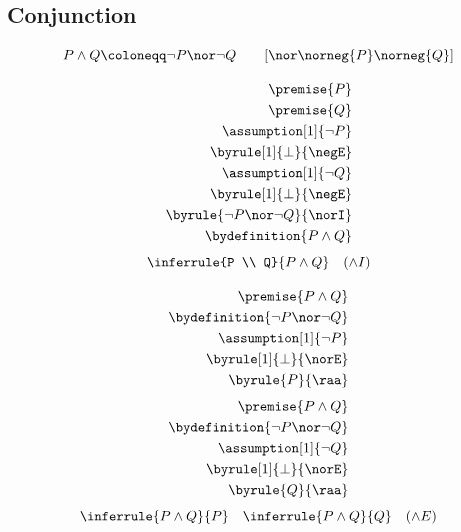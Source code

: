 \subsection{Conjunction}

\newcommand{\norwedge}[2]{{\nor}\norneg{#1}\norneg{#2}}
\begin{notation}
    \[P \wedge Q \coloneqq \neg P \nor \neg Q \qquad [\norwedge{P}{Q}]\]
\end{notation}

\begin{align*}
    \premise{P}\\
    \premise{Q}\\
    \assumption[1]{\neg P}\\
    \byrule[1]{\bot}{\negE} \\
    \assumption[1]{\neg Q}\\
    \byrule[1]{\bot}{\negE}\\
    \byrule{\neg P \nor \neg Q}{\norI}\\
    \bydefinition{P \wedge Q}
\end{align*}
\newcommand{\wedgeI}{{\wedge}I}
\[\inferrule{P \\ Q}{P \wedge Q} \quad (\wedgeI)\]

\begin{align*}
    \premise{P \wedge Q}\\
    \bydefinition{\neg P \nor \neg Q}\\
    \assumption[1]{\neg P}\\
    \byrule[1]{\bot}{\norE}\\
    \byrule{P}{\raa}
\end{align*}
\begin{align*}
    \premise{P \wedge Q}\\
    \bydefinition{\neg P \nor \neg Q}\\
    \assumption[1]{\neg Q}\\
    \byrule[1]{\bot}{\norE}\\
    \byrule{Q}{\raa}
\end{align*}
\newcommand{\wedgeE}{{\wedge}E}
\[\inferrule{P \wedge Q}{P} \quad \inferrule{P \wedge Q}{Q} \quad (\wedgeE)\]


